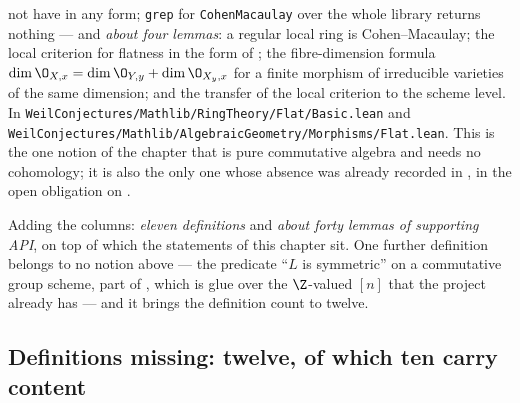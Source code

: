 \begin{enumerate}
  not have in any form; \texttt{grep} for \texttt{CohenMacaulay} over the whole
  library returns nothing --- and \emph{about four lemmas}: a regular local
  ring is Cohen--Macaulay; the local criterion for flatness in the form of
  ; the fibre-dimension formula
  $\dim\O_{X,x}=\dim\O_{Y,y}+\dim\O_{X_y,x}$ for a finite morphism of
  irreducible varieties of the same dimension; and the transfer of the local
  criterion to the scheme level.  In
  \texttt{WeilConjectures/Mathlib/RingTheory/Flat/Basic.lean} and
  \texttt{WeilConjectures/Mathlib/AlgebraicGeometry/Morphisms/Flat.lean}.
  This is the one notion of the chapter that is pure commutative algebra and
  needs no cohomology; it is also the only one whose absence was already
  recorded in , in the open obligation on
  .
\end{enumerate}

Adding the columns: \emph{eleven definitions} and \emph{about forty lemmas of
supporting API}, on top of which the statements of this chapter sit.  One
further definition belongs to no notion above --- the predicate
``$L$ is symmetric'' on a commutative group scheme, part of
, which is glue over the $\Z$-valued $[n]$ that the
project already has --- and it brings the definition count to twelve.

\subsection*{Definitions missing: twelve, of which ten carry content}


